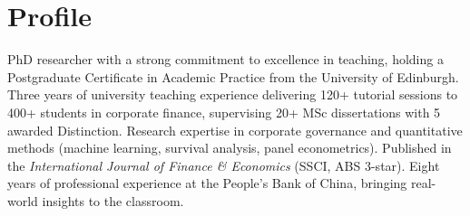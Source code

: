 \section{Profile}
PhD researcher with a strong commitment to excellence in teaching, holding a Postgraduate Certificate in Academic Practice from the University of Edinburgh. Three years of university teaching experience delivering 120+ tutorial sessions to 400+ students in corporate finance, supervising 20+ MSc dissertations with 5 awarded Distinction. Research expertise in corporate governance and quantitative methods (machine learning, survival analysis, panel econometrics). Published in the \textit{International Journal of Finance \& Economics} (SSCI, ABS 3-star). Eight years of professional experience at the People's Bank of China, bringing real-world insights to the classroom.
